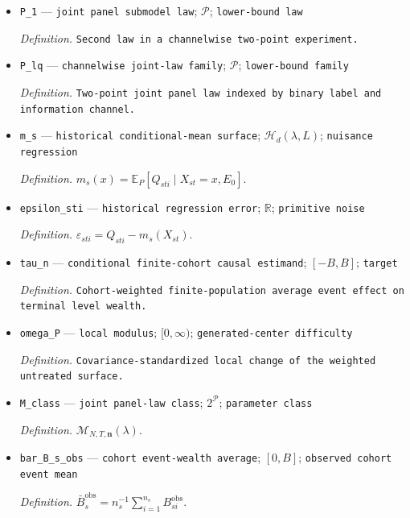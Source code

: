 \documentclass{article}
\begin{document}
\begin{itemize}
  \item \texttt{P\_\allowbreak{}1} --- \texttt{joint panel submodel law}; \(\mathcal P\); \texttt{lower-\allowbreak{}bound law}
  \par\smallskip\noindent\emph{Definition.} \texttt{Second law in a channelwise two-\allowbreak{}point experiment.}
  \item \texttt{P\_\allowbreak{}lq} --- \texttt{channelwise joint-\allowbreak{}law family}; \(\mathcal P\); \texttt{lower-\allowbreak{}bound family}
  \par\smallskip\noindent\emph{Definition.} \texttt{Two-\allowbreak{}point joint panel law indexed by binary label and information channel.}
  \item \texttt{m\_\allowbreak{}s} --- \texttt{historical conditional-\allowbreak{}mean surface}; \(\mathcal H_d(\lambda,L)\); \texttt{nuisance regression}
  \par\smallskip\noindent\emph{Definition.} \(m_s(x)=\mathbb E_P[Q_{sti}\mid X_{st}=x,E_0]\).
  \item \texttt{epsilon\_\allowbreak{}sti} --- \texttt{historical regression error}; \(\mathbb R\); \texttt{primitive noise}
  \par\smallskip\noindent\emph{Definition.} \(\varepsilon_{sti}=Q_{sti}-m_s(X_{st})\).
  \item \texttt{tau\_\allowbreak{}n} --- \texttt{conditional finite-\allowbreak{}cohort causal estimand}; \([-B,B]\); \texttt{target}
  \par\smallskip\noindent\emph{Definition.} \texttt{Cohort-\allowbreak{}weighted finite-\allowbreak{}population average event effect on terminal level wealth.}
  \item \texttt{omega\_\allowbreak{}P} --- \texttt{local modulus}; \([0,\infty)\); \texttt{generated-\allowbreak{}center difficulty}
  \par\smallskip\noindent\emph{Definition.} \texttt{Covariance-\allowbreak{}standardized local change of the weighted untreated surface.}
  \item \texttt{M\_\allowbreak{}class} --- \texttt{joint panel-\allowbreak{}law class}; \(2^{\mathcal P}\); \texttt{parameter class}
  \par\smallskip\noindent\emph{Definition.} \(\mathcal M_{N,T,\mathbf n}(\lambda)\).
  \item \texttt{bar\_\allowbreak{}B\_\allowbreak{}s\_\allowbreak{}obs} --- \texttt{cohort event-\allowbreak{}wealth average}; \([0,B]\); \texttt{observed cohort event mean}
  \par\smallskip\noindent\emph{Definition.} \(\bar B_s^{\mathrm{obs}}=n_s^{-1}\sum_{i=1}^{n_s}B_{si}^{\mathrm{obs}}\).

\end{itemize}
\end{document}
